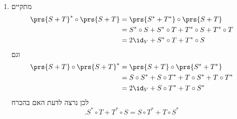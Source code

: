 \documentclass[a4paper,10pt,twoside,openany]{book}
\begin{document}
\begin{solution}
\begin{enumerate}
\item מתקיים
\begin{align*}
\prs{S+T}^* \circ \prs{S+T} &= \prs{S^* + T^*} \circ \prs{S+T}
\\&=
S^* \circ S + S^* \circ T + T^* \circ S + T^* \circ T
\\&=
2 \id_V + S^* \circ T + T^* \circ S
\end{align*}
וגם
\begin{align*}
\prs{S+T} \circ \prs{S+T}^* &= \prs{S + T} \circ \prs{S^* + T^*}
\\&= S \circ S^* + S \circ T^* + T \circ S^* + T \circ T^*
\\ \hphantom{\prs{S+T} \circ \prs{S+T}^*} &= 2\id_V + S \circ T^* + T \circ S^*
\end{align*}
לכן נרצה לדעת האם בהכרח
\[\text{.} S^* \circ T + T^* \circ S = S \circ T^* + T \circ S^*\]


\end{enumerate}
\end{solution}
\end{document}
